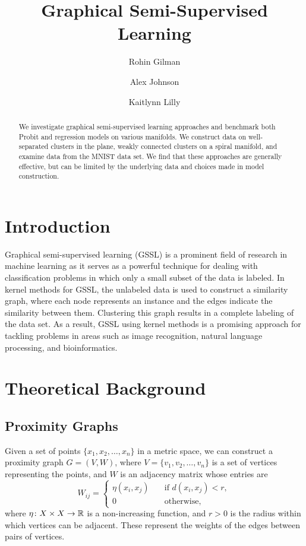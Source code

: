 \documentclass[12pt]{amsart}
\title{Graphical Semi-Supervised Learning}
\author{Rohin Gilman \and Alex Johnson \and Kaitlynn Lilly}
\begin{document}
\begin{abstract}
    We investigate graphical semi-supervised learning approaches and benchmark both Probit and regression models on various manifolds. We construct data on well-separated clusters in the plane, weakly connected clusters on a spiral manifold, and examine data from the MNIST data set. We find that these approaches are generally effective, but can be limited by the underlying data and choices made in model construction.
\end{abstract}

\maketitle

\section{Introduction} 
Graphical semi-supervised learning (GSSL) is a prominent field of research in machine learning as it serves as a powerful technique for dealing with classification problems in which only a small subset of the data is labeled. In kernel methods for GSSL, the unlabeled data is used to construct a similarity graph, where each node represents an instance and the edges indicate the similarity between them. Clustering this graph results in a complete labeling of the data set. As a result, GSSL using kernel methods is a promising approach for tackling problems in areas such as image recognition, natural language processing, and bioinformatics.

\section{Theoretical Background}

\subsection{Proximity Graphs}
Given a set of points $\{x_1, x_2, \dots, x_n\}$ in a metric space, we can construct a proximity graph $G = (V, W)$, where $V = \{v_1, v_2, \dots, v_n\}$ is a set of vertices representing the points, and $W$ is an adjacency matrix whose entries are
\[W_{ij} = \begin{cases}
  \eta(x_i,x_j) \quad&\text{if } d(x_i,x_j) < r, \\
  0 \quad&\text{otherwise},
\end{cases}\]
where $\eta\colon X\times X \to \mathbb{R}$ is a non-increasing function, and $r > 0$ is the radius within which vertices can be adjacent. These represent the weights of the edges between pairs of vertices.
\end{document}
